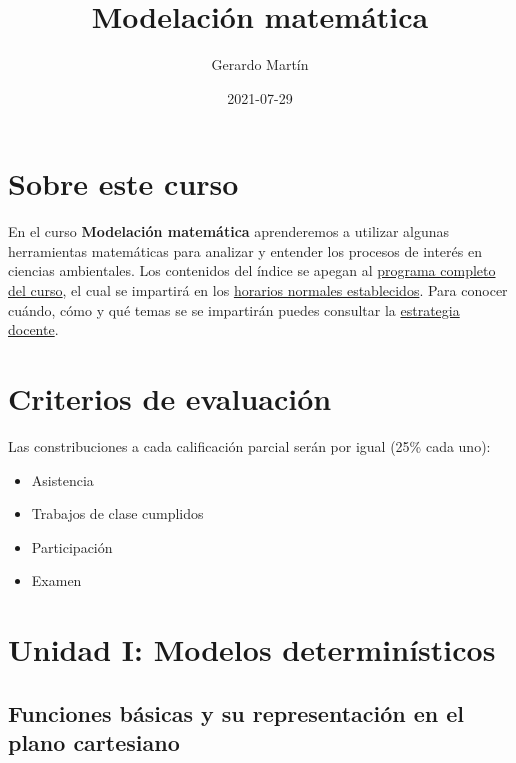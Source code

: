 \documentclass[
]{book}
\title{Modelación matemática}
\author{Gerardo Martín}
\date{2021-07-29}
\providecommand{\tightlist}{%
  \setlength{\itemsep}{0pt}\setlength{\parskip}{0pt}}
\begin{document}
\maketitle

{
\setcounter{tocdepth}{1}
\tableofcontents
}
\hypertarget{sobre-este-curso}{%
\chapter{Sobre este curso}\label{sobre-este-curso}}

En el curso \textbf{Modelación matemática} aprenderemos a utilizar algunas herramientas matemáticas para analizar y entender los procesos de interés en ciencias ambientales. Los contenidos del índice se apegan al \href{Programa-curso.pdf}{programa completo del curso}, el cual se impartirá en los \href{Horario.pdf}{horarios normales establecidos}. Para conocer cuándo, cómo y qué temas se se impartirán puedes consultar la \href{Estrategia-docente.pdf}{estrategia docente}.

\hypertarget{criterios-de-evaluaciuxf3n}{%
\chapter{Criterios de evaluación}\label{criterios-de-evaluaciuxf3n}}

Las constribuciones a cada calificación parcial serán por igual (25\% cada uno):

\begin{itemize}
\tightlist
\item
  Asistencia
\item
  Trabajos de clase cumplidos
\item
  Participación
\item
  Examen
\end{itemize}

\hypertarget{unidad-i-modelos-determinuxedsticos}{%
\chapter{Unidad I: Modelos determinísticos}\label{unidad-i-modelos-determinuxedsticos}}

\hypertarget{funciones-buxe1sicas-y-su-representaciuxf3n-en-el-plano-cartesiano}{%
\section{Funciones básicas y su representación en el plano cartesiano}\label{funciones-buxe1sicas-y-su-representaciuxf3n-en-el-plano-cartesiano}}
\end{document}

